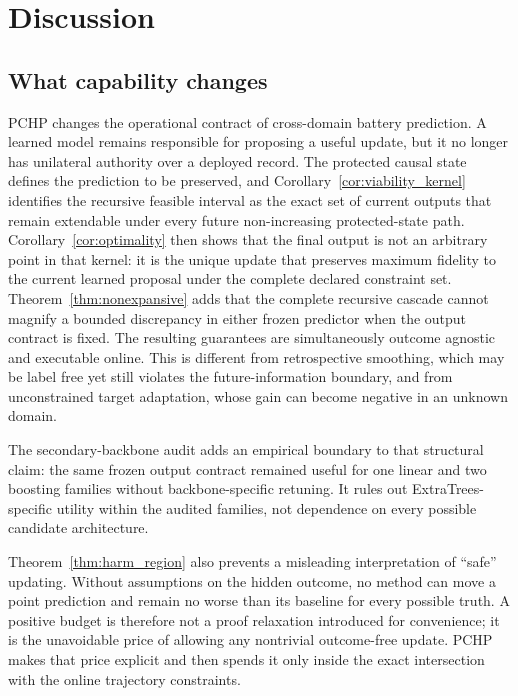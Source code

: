 \documentclass[11pt]{article}
\begin{document}
\section{Discussion}

\subsection{What capability changes}

PCHP changes the operational contract of cross-domain battery prediction. A learned model remains responsible for proposing a useful update, but it no longer has unilateral authority over a deployed record. The protected causal state defines the prediction to be preserved, and Corollary~\ref{cor:viability_kernel} identifies the recursive feasible interval as the exact set of current outputs that remain extendable under every future non-increasing protected-state path. Corollary~\ref{cor:optimality} then shows that the final output is not an arbitrary point in that kernel: it is the unique update that preserves maximum fidelity to the current learned proposal under the complete declared constraint set. Theorem~\ref{thm:nonexpansive} adds that the complete recursive cascade cannot magnify a bounded discrepancy in either frozen predictor when the output contract is fixed. The resulting guarantees are simultaneously outcome agnostic and executable online. This is different from retrospective smoothing, which may be label free yet still violates the future-information boundary, and from unconstrained target adaptation, whose gain can become negative in an unknown domain.

The secondary-backbone audit adds an empirical boundary to that structural claim: the same frozen output contract remained useful for one linear and two boosting families without backbone-specific retuning. It rules out ExtraTrees-specific utility within the audited families, not dependence on every possible candidate architecture.

Theorem~\ref{thm:harm_region} also prevents a misleading interpretation of ``safe'' updating. Without assumptions on the hidden outcome, no method can move a point prediction and remain no worse than its baseline for every possible truth. A positive budget is therefore not a proof relaxation introduced for convenience; it is the unavoidable price of allowing any nontrivial outcome-free update. PCHP makes that price explicit and then spends it only inside the exact intersection with the online trajectory constraints.
\end{document}
